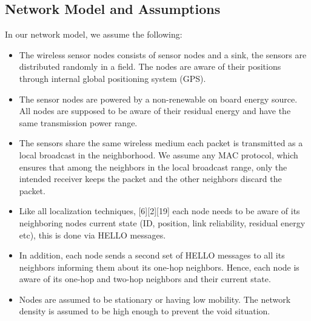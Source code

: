 \documentclass[fleqn,twoside]{article}
\begin{document}
\subsection{Network Model and Assumptions}
In our network model, we assume the following:
\begin{itemize}
  \item The wireless sensor nodes consists of  sensor nodes and a sink, the sensors are distributed randomly in a field. The nodes are aware of their positions through internal global positioning system (GPS).
  \item The  sensor nodes are powered by a non-renewable on board energy source. All 
  nodes are supposed to be aware of their residual energy and have the same transmission power range.
  \item The sensors share the same wireless medium each packet is transmitted as a local broadcast in the neighborhood. We assume any MAC protocol, which ensures that among the neighbors in the local broadcast range, only the intended receiver keeps the packet and the other neighbors discard the packet.
  \item Like all localization techniques, [6][2][19] each node needs to be aware of its 
  neighboring nodes current state (ID, position, link reliability, residual energy etc), this is done via HELLO messages. 
  \item In addition, each node sends a second set of HELLO messages to all its neighbors informing them about its one-hop neighbors. 
  Hence, each node is aware of its one-hop and two-hop neighbors and their current state.
  \item Nodes are assumed to be stationary or having low mobility. The network density is assumed to be high enough to prevent the void situation.
\end{itemize}
\end{document}
